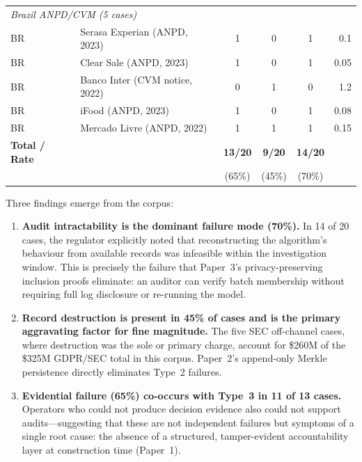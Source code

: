 \begin{table}[h]
\begin{tabular}{llccc r}
\midrule
\multicolumn{6}{l}{\textit{Brazil ANPD/CVM (5 cases)}} \\
BR   & Serasa Experian (ANPD, 2023)        & 1 & 0 & 1 & 0.1   \\
BR   & Clear Sale (ANPD, 2023)             & 1 & 0 & 1 & 0.05  \\
BR   & Banco Inter (CVM notice, 2022)      & 0 & 1 & 0 & 1.2   \\
BR   & iFood (ANPD, 2023)                  & 1 & 0 & 1 & 0.08  \\
BR   & Mercado Livre (ANPD, 2022)          & 1 & 1 & 1 & 0.15  \\
\midrule
\textbf{Total / Rate} & & \textbf{13/20} & \textbf{9/20} & \textbf{14/20} & \\
& & (65\%) & (45\%) & (70\%) & \\
\bottomrule
\end{tabular}
\end{table}

Three findings emerge from the corpus:

\begin{enumerate}
  \item \textbf{Audit intractability is the dominant failure mode
  (70\%).} In 14 of 20 cases, the regulator explicitly noted that
  reconstructing the algorithm's behaviour from available records was
  infeasible within the investigation window. This is precisely the
  failure that Paper~3's privacy-preserving inclusion proofs eliminate:
  an auditor can verify batch membership without requiring full log
  disclosure or re-running the model.

  \item \textbf{Record destruction is present in 45\% of cases and
  is the primary aggravating factor for fine magnitude.} The five SEC
  off-channel cases, where destruction was the sole or primary charge,
  account for \$260M of the \$325M GDPR/SEC total in this corpus.
  Paper~2's append-only Merkle persistence directly eliminates
  Type~2 failures.

  \item \textbf{Evidential failure (65\%) co-occurs with Type~3
  in 11 of 13 cases.} Operators who could not produce decision evidence
  also could not support audits---suggesting that these are not
  independent failures but symptoms of a single root cause: the absence
  of a structured, tamper-evident accountability layer at construction
  time (Paper~1).
\end{enumerate}

